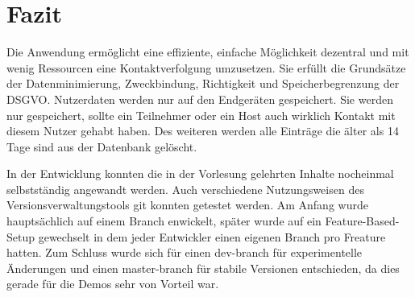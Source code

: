 \begin{table}[]
\caption{Struktur der Datenbanktabelle dbRoom}
\label{tab:dbRoom}
\end{table}
\section{Fazit}
\label{sec:Fazit}
Die Anwendung ermöglicht eine effiziente, einfache Möglichkeit dezentral und mit wenig Ressourcen eine Kontaktverfolgung umzusetzen.
Sie erfüllt die Grundsätze der Datenminimierung, Zweckbindung, Richtigkeit und Speicherbegrenzung der DSGVO. Nutzerdaten werden nur auf den Endgeräten gespeichert. 
Sie werden nur gespeichert, sollte ein Teilnehmer oder ein Host auch wirklich Kontakt mit diesem Nutzer gehabt haben. 
Des weiteren werden alle Einträge die älter als 14 Tage sind aus der Datenbank gelöscht.

In der Entwicklung konnten die in der Vorlesung gelehrten Inhalte nocheinmal selbstständig angewandt werden. 
Auch verschiedene Nutzungsweisen des Versionsverwaltungstools git konnten getestet werden. 
Am Anfang wurde hauptsächlich auf einem Branch enwickelt, später wurde auf ein Feature-Based-Setup gewechselt in dem jeder Entwickler einen eigenen Branch pro Freature hatten. 
Zum Schluss wurde sich für einen dev-branch für experimentelle Änderungen und einen master-branch für stabile Versionen entschieden, da dies gerade für die Demos sehr von Vorteil war.

